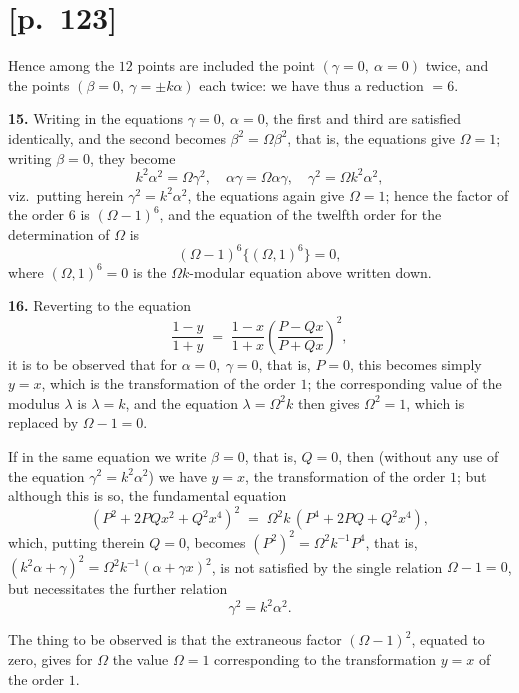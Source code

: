 \documentclass[11pt]{article}
\begin{document}
\section*{[p.~123]}

Hence among the $12$ points are included the point $(\gamma=0,\ \alpha=0)$
twice, and the points $(\beta=0,\ \gamma=\pm k\alpha)$ each twice: we have
thus a reduction $=6$.

\medskip
\textbf{15.} Writing in the equations $\gamma=0,\ \alpha=0$, the first and
third are satisfied identically, and the second becomes
$\beta^2 = \Omega\beta^2$, that is, the equations give $\Omega=1$; writing
$\beta=0$, they become
\[
k^2\alpha^2 = \Omega\gamma^2,\quad
\alpha\gamma = \Omega\alpha\gamma,\quad
\gamma^2 = \Omega k^2 \alpha^2,
\]
viz.\ putting herein $\gamma^2 = k^2\alpha^2$, the equations again give
$\Omega=1$; hence the factor of the order $6$ is $(\Omega - 1)^6$, and the
equation of the twelfth order for the determination of $\Omega$ is
\[
(\Omega - 1)^6 \bigl\{(\Omega,1)^6\bigr\} = 0,
\]
where $(\Omega, 1)^6 = 0$ is the $\Omega k$-modular equation above written down.

\medskip
\textbf{16.} Reverting to the equation
\[
\frac{1-y}{1+y} \;=\; \frac{1-x}{1+x}\!\left(\frac{P - Q x}{P + Q x}\right)^{\!2},
\]
it is to be observed that for $\alpha=0,\ \gamma=0$, that is, $P=0$, this
becomes simply $y=x$, which is the transformation of the order $1$; the
corresponding value of the modulus $\lambda$ is $\lambda=k$, and the
equation $\lambda = \Omega^2 k$ then gives $\Omega^2 = 1$, which is
replaced by $\Omega - 1 = 0$.

If in the same equation we write $\beta=0$, that is, $Q=0$, then (without
any use of the equation $\gamma^2 = k^2\alpha^2$) we have $y=x$, the
transformation of the order $1$; but although this is so, the fundamental
equation
\[
(P^2 + 2PQ x^2 + Q^2 x^4)^2 \;=\; \Omega^2 k\,(P^4 + 2PQ + Q^2 x^4),
\]
which, putting therein $Q=0$, becomes $(P^2)^2 = \Omega^2 k^{-1} P^4$, that
is, $(k^2\alpha + \gamma)^2 = \Omega^2 k^{-1}(\alpha + \gamma x)^2$, is not
satisfied by the single relation $\Omega - 1 = 0$, but necessitates the
further relation
\[
\gamma^2 = k^2\alpha^2.
\]

The thing to be observed is that the extraneous factor $(\Omega - 1)^2$,
equated to zero, gives for $\Omega$ the value $\Omega = 1$ corresponding to
the transformation $y = x$ of the order $1$.
\end{document}
